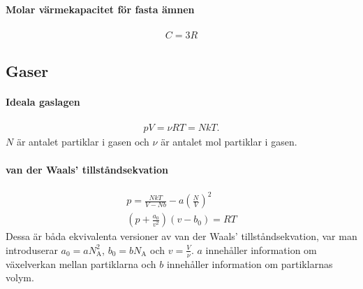 \paragraph{Molar värmekapacitet för fasta ämnen}
\begin{align*}
	C = 3R
\end{align*}

\subsection{Gaser}

\paragraph{Ideala gaslagen}
\begin{align*}
	pV = \nu RT = NkT.
\end{align*}
$N$ är antalet partiklar i gasen och $\nu$ är antalet mol partiklar i gasen.

\paragraph{van der Waals' tillståndsekvation}
\begin{align*}
	p = \frac{NkT}{V - Nb} - a\left(\frac{N}{V}\right)^2\\
	\left(p + \frac{a_0}{v^2}\right)(v - b_0) = RT
\end{align*}
Dessa är båda ekvivalenta versioner av van der Waals' tillståndsekvation, var man introduserar $a_0 = a N_\text{A}^2$, $b_0 = bN_\text{A}$ och $v = \frac{V}{\nu}$. $a$ innehåller information om växelverkan mellan partiklarna och $b$ innehåller information om partiklarnas volym.

